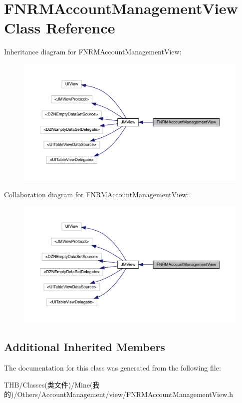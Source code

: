 \hypertarget{interface_f_n_r_m_account_management_view}{}\section{F\+N\+R\+M\+Account\+Management\+View Class Reference}
\label{interface_f_n_r_m_account_management_view}


Inheritance diagram for F\+N\+R\+M\+Account\+Management\+View\+:\nopagebreak
\begin{figure}[H]
\begin{center}
\leavevmode
\includegraphics[width=350pt]{interface_f_n_r_m_account_management_view__inherit__graph}
\end{center}
\end{figure}


Collaboration diagram for F\+N\+R\+M\+Account\+Management\+View\+:\nopagebreak
\begin{figure}[H]
\begin{center}
\leavevmode
\includegraphics[width=350pt]{interface_f_n_r_m_account_management_view__coll__graph}
\end{center}
\end{figure}
\subsection*{Additional Inherited Members}


The documentation for this class was generated from the following file\+:\begin{DoxyCompactItemize}
\item 
T\+H\+B/\+Classes(类文件)/\+Mine(我的)/\+Others/\+Account\+Management/view/F\+N\+R\+M\+Account\+Management\+View.\+h\end{DoxyCompactItemize}
